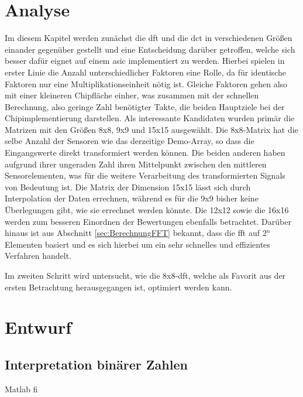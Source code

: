 \chapter{Analyse}
Im diesem Kapitel werden zunächst die \gls{dft} und die \gls{dct} in verschiedenen Größen einander gegenüber gestellt und eine Entscheidung darüber getroffen, welche
sich besser dafür eignet auf einem \gls{asic} implementiert zu werden. Hierbei spielen in erster Linie die Anzahl unterschiedlicher Faktoren eine Rolle, 
da für identische Faktoren nur eine Multiplikationseinheit nötig ist. Gleiche Faktoren gehen also mit einer kleineren Chipfläche einher, was zusammen mit der schnellen 
Berechnung, also geringe Zahl benötigter Takte, die beiden Hauptziele bei der Chipimplementierung darstellen.
Als interessante Kandidaten wurden primär die Matrizen mit den Größen 8x8, 9x9 und 15x15 ausgewählt. 
Die 8x8-Matrix hat die selbe Anzahl der Sensoren wie das derzeitige Demo-Array, so dass die Eingangswerte
direkt transformiert werden können. 
Die beiden anderen haben aufgrund ihrer ungeraden Zahl ihren Mittelpunkt zwischen den mittleren Sensorelementen, was für die 
weitere Verarbeitung des transformierten Signals von Bedeutung ist. Die Matrix der Dimension 15x15 lässt sich durch Interpolation der Daten errechnen, während es für
die 9x9 bisher keine Überlegungen gibt, wie sie errechnet werden könnte.
Die 12x12 sowie die 16x16 werden zum besseren Einordnen der Bewertungen ebenfalls betrachtet.
Darüber hinaus ist aus Abschnitt \ref{sec:BerechnungFFT} bekannt, dass die \gls{fft} auf 2$^n$ Elementen basiert und es sich hierbei um ein sehr schnelles und 
effizientes Verfahren handelt. 

Im zweiten Schritt wird untersucht, wie die 8x8-\gls{dft}, welche als Favorit aus der ersten Betrachtung herausgegangen ist, optimiert werden kann.


 
 
 
 
 

 
 
 
\chapter{Entwurf}

 
\section{Interpretation binärer Zahlen}
 Matlab fi
 
